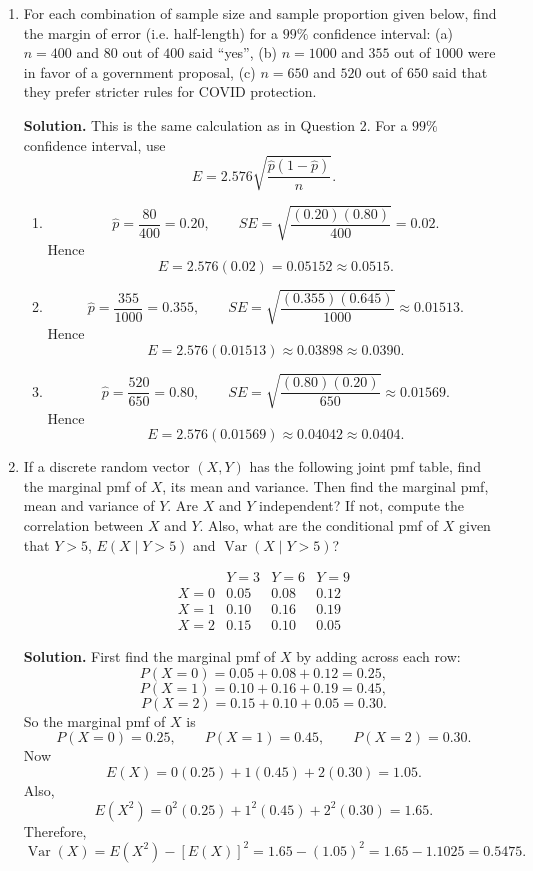 \documentclass[12pt]{article}
\begin{document}
\begin{enumerate}[label=(\arabic*), leftmargin=*]
\item For each combination of sample size and sample proportion given below, find the margin of error (i.e. half-length) for a $99\%$ confidence interval: (a) $n=400$ and $80$ out of $400$ said ``yes'', (b) $n=1000$ and $355$ out of $1000$ were in favor of a government proposal, (c) $n=650$ and $520$ out of $650$ said that they prefer stricter rules for COVID protection.

\par\medskip
\noindent\textbf{Solution.}
This is the same calculation as in Question 2. For a $99\%$ confidence interval, use
\[
E=2.576\sqrt{\frac{\hat p(1-\hat p)}{n}}.
\]

\begin{enumerate}[label=(\alph*)]
    \item
    \[
    \hat p=\frac{80}{400}=0.20,
    \qquad
    SE=\sqrt{\frac{(0.20)(0.80)}{400}}=0.02.
    \]
    Hence
    \[
    E=2.576(0.02)=0.05152\approx 0.0515.
    \]

    \item
    \[
    \hat p=\frac{355}{1000}=0.355,
    \qquad
    SE=\sqrt{\frac{(0.355)(0.645)}{1000}}\approx 0.01513.
    \]
    Hence
    \[
    E=2.576(0.01513)\approx 0.03898\approx 0.0390.
    \]

    \item
    \[
    \hat p=\frac{520}{650}=0.80,
    \qquad
    SE=\sqrt{\frac{(0.80)(0.20)}{650}}\approx 0.01569.
    \]
    Hence
    \[
    E=2.576(0.01569)\approx 0.04042\approx 0.0404.
    \]
\end{enumerate}

\item If a discrete random vector $(X,Y)$ has the following joint pmf table, find the marginal pmf of $X$, its mean and variance. Then find the marginal pmf, mean and variance of $Y$. Are $X$ and $Y$ independent? If not, compute the correlation between $X$ and $Y$. Also, what are the conditional pmf of $X$ given that $Y>5$, $E(X\mid Y>5)$ and $\operatorname{Var}(X\mid Y>5)$?

\[
\begin{array}{c|ccc}
 & Y=3 & Y=6 & Y=9\\ \hline
X=0 & 0.05 & 0.08 & 0.12\\
X=1 & 0.10 & 0.16 & 0.19\\
X=2 & 0.15 & 0.10 & 0.05
\end{array}
\]

\par\medskip
\noindent\textbf{Solution.}
First find the marginal pmf of $X$ by adding across each row:
\[
P(X=0)=0.05+0.08+0.12=0.25,
\]
\[
P(X=1)=0.10+0.16+0.19=0.45,
\]
\[
P(X=2)=0.15+0.10+0.05=0.30.
\]
So the marginal pmf of $X$ is
\[
P(X=0)=0.25,\qquad P(X=1)=0.45,\qquad P(X=2)=0.30.
\]
Now
\[
E(X)=0(0.25)+1(0.45)+2(0.30)=1.05.
\]
Also,
\[
E(X^2)=0^2(0.25)+1^2(0.45)+2^2(0.30)=1.65.
\]
Therefore,
\[
\operatorname{Var}(X)=E(X^2)-[E(X)]^2=1.65-(1.05)^2=1.65-1.1025=0.5475.
\]


\end{enumerate}
\end{document}
